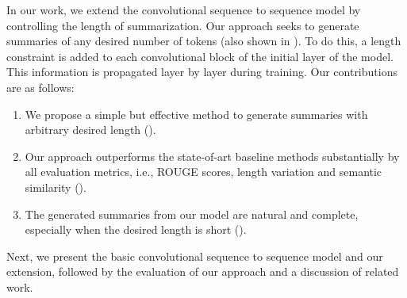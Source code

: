 In our work, we extend the convolutional sequence to sequence
model \cite{gehring2017convs2s} by
controlling the length of summarization. Our approach seeks to generate summaries
of any desired number of tokens (also shown in ).
To do this, a length constraint is added to each convolutional block
of the initial layer of the model. This information is
propagated layer by layer during training. 
Our contributions are as follows:
\begin{enumerate}
\item We propose a simple but effective method to generate summaries 
with arbitrary desired length ().
\item Our approach outperforms the state-of-art baseline methods 
substantially by all evaluation metrics, i.e., ROUGE scores, length
variation and semantic similarity ().
\item The generated summaries from our model are natural and complete,
especially when the desired length is short ().
\end{enumerate}

Next, we present the basic convolutional sequence to sequence  model 
and our extension, followed by the evaluation of our approach and a discussion
of related work. 

